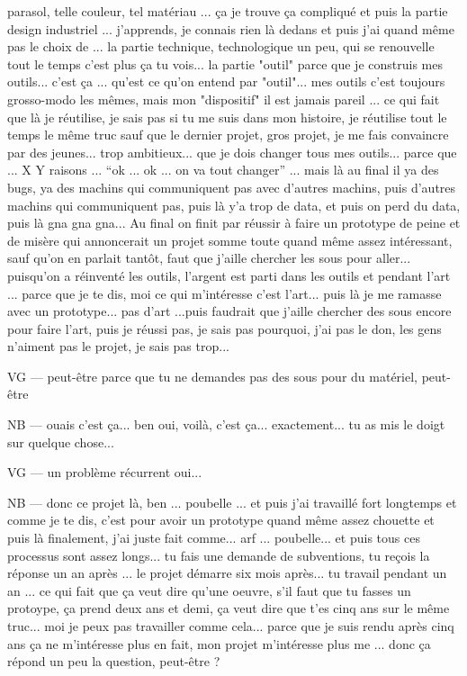 parasol, telle couleur, tel matériau ... ça je trouve ça compliqué et puis la partie design industriel ... j'apprends, je connais rien là dedans et puis j'ai quand même pas le choix de ... la partie technique, technologique un peu, qui se renouvelle tout le temps c'est plus ça tu vois... la partie "outil" parce que je construis mes outils... c'est ça ... qu'est ce qu'on entend par "outil"... mes outils c'est toujours grosso-modo les mêmes, mais mon "dispositif" il est jamais pareil ...  ce qui fait que là je réutilise, je sais pas si tu me suis dans mon histoire, je réutilise tout le temps le même truc sauf que le dernier projet, gros projet, je me fais convaincre par des jeunes... trop ambitieux... que je dois changer tous mes outils... parce que ... X Y raisons ... ``ok ... ok ... on va tout changer'' ... mais là au final il ya des bugs, ya des machins qui communiquent pas avec d'autres machins, puis d'autres machins qui communiquent pas, puis là y'a trop de data, et puis on perd du data, puis là gna gna gna... Au final on finit par réussir à faire un prototype de peine et de misère qui annoncerait un projet somme toute quand même assez intéressant, sauf qu'on en parlait tantôt, faut que j'aille chercher les sous pour aller... puisqu'on a réinventé les outils, l'argent est parti dans les outils et pendant l'art ... parce que je te dis, moi ce qui m'intéresse c'est l'art...  puis là je me ramasse avec un prototype... pas d'art ...puis faudrait que j'aille chercher des sous encore pour faire l'art, puis je réussi pas, je sais pas pourquoi, j'ai pas le don, les gens n'aiment pas le projet, je sais pas trop...


VG — peut-être parce que tu ne demandes pas des sous pour du matériel, peut-être

NB — ouais c'est ça... ben oui, voilà, c'est ça... exactement... tu as mis le doigt sur quelque chose...

VG — un problème récurrent oui...

NB — donc ce projet là, ben ... poubelle ... et puis j'ai travaillé fort longtemps et comme je te dis, c'est pour avoir un prototype quand même assez chouette et puis là finalement, j'ai juste fait comme... arf ... poubelle... et puis tous ces processus sont assez longs... tu fais une demande de subventions, tu reçois la réponse un an après ... le projet démarre six mois après... tu travail pendant un an ... ce qui fait que ça veut dire qu'une oeuvre, s'il faut que tu fasses un protoype, ça prend deux ans et demi, ça veut dire que t'es cinq ans sur le même truc... moi je peux pas travailler comme cela... parce que je suis rendu après cinq ans ça ne m'intéresse plus en fait, mon projet m'intéresse plus me ... donc ça répond un peu la question, peut-être ? 

